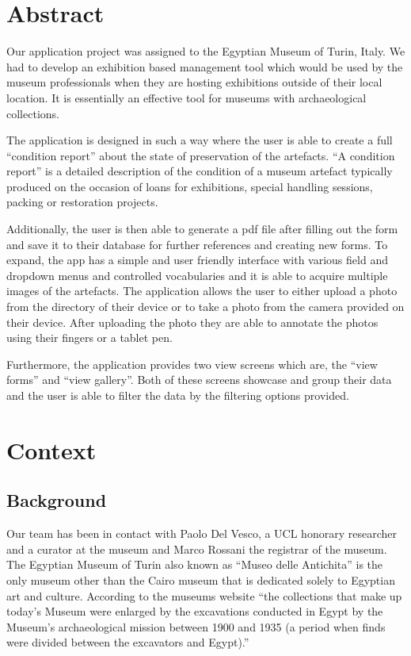 \documentclass[12pt]{article}
\begin{document}
\section{Abstract}\label{sec:abstract}
Our application project was assigned to the Egyptian Museum of Turin, Italy. We had to develop an exhibition based management tool which would be used by the museum professionals when they are hosting exhibitions outside of their local location. It is essentially an effective tool for museums with archaeological collections.  
\par
The application is designed in such a way where the user is able to create a full ``condition report''  about the state of preservation of the artefacts. ``A condition report'' is a detailed description of the condition of a museum artefact typically produced on the occasion of loans for exhibitions, special handling sessions, packing or restoration projects. 
\par
Additionally, the user is then able to generate a pdf file after filling out the form and save it to their database for further references and creating new forms. To expand, the app has a simple and user friendly interface with various field and dropdown menus and controlled vocabularies and it is able to acquire multiple images of the artefacts. The application allows the user to either upload a photo from the directory of their device or to take a photo from the camera provided on their device. After uploading the photo they are able to annotate the photos using their fingers or a tablet pen. 
\par
Furthermore, the application provides two view screens which are, the ``view forms'' and ``view gallery''. Both of these screens showcase and group their data and the user is able to filter the data by the filtering options provided. 




\newpage
\section{Context}\label{sec:context}

\subsection{Background}
Our team has been in contact with Paolo Del Vesco, a UCL honorary researcher and a curator at the museum and Marco Rossani the registrar of the museum.  The Egyptian Museum of Turin also known as ``Museo delle Antichita'' is the only museum other than the Cairo museum that is dedicated solely to Egyptian art and culture. According to the museums website ``the collections that make up today’s Museum were enlarged by the excavations conducted in Egypt by the Museum’s archaeological mission between 1900 and 1935 (a period when finds were divided between the excavators and Egypt).''
\end{document}
